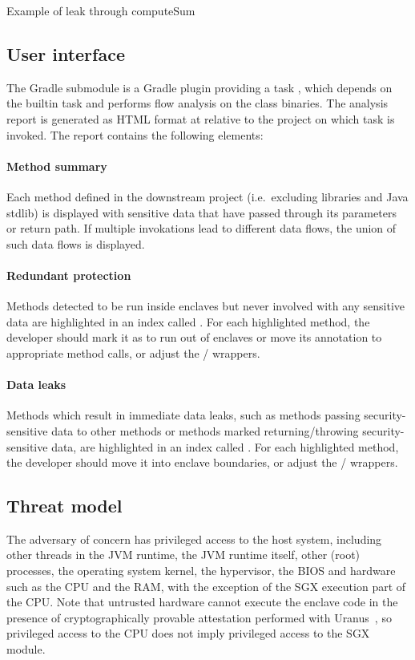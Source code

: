 {Example of leak through computeSum}

\subsection{User interface}\label{subsec:user-interface}
The  Gradle submodule
is a Gradle plugin providing a task ,
which depends on the  builtin task
and performs flow analysis on the class binaries.
The analysis report is generated as HTML format at
relative to the project on which task is invoked.
The report contains the following elements:

\paragraph{Method summary}
Each method defined in the downstream project (i.e.\ excluding libraries and Java stdlib)
is displayed with sensitive data that have passed through its parameters or return path.
If multiple invokations lead to different data flows,
the union of such data flows is displayed.

\paragraph{Redundant protection}
Methods detected to be run inside enclaves but never involved with any sensitive data
are highlighted in an index called .
For each highlighted method, the developer
should mark it as  to run out of enclaves
or move its  annotation to appropriate method calls,
or adjust the / wrappers.

\paragraph{Data leaks}
Methods which result in immediate data leaks,
such as methods passing security-sensitive data to other  methods
or methods marked  returning/throwing security-sensitive data,
are highlighted in an index called .
For each highlighted method, the developer
should move it into enclave boundaries,
or adjust the / wrappers.

\subsection{Threat model}\label{subsec:threat-model}
The adversary of concern has privileged access to the host system,
including other threads in the JVM runtime, the JVM runtime itself,
other (root) processes, the operating system kernel,
the hypervisor, the BIOS and hardware such as the CPU and the RAM,
with the exception of the SGX execution part of the CPU\@.
Note that untrusted hardware cannot execute the enclave code
in the presence of cryptographically provable attestation performed with Uranus~\cite{uranus},
so privileged access to the CPU does not imply privileged access to the SGX module.

